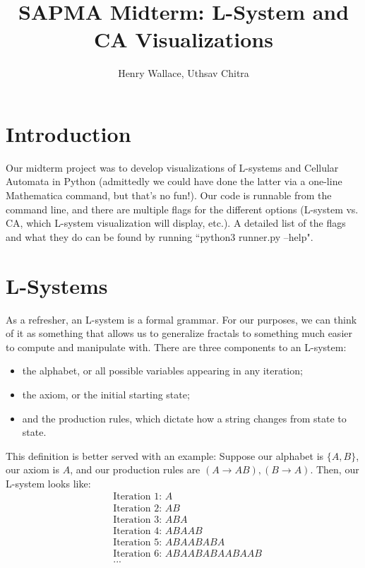 \documentclass[a4paper,11pt]{article}
\title{SAPMA Midterm: L-System and CA Visualizations}
\author{Henry Wallace, Uthsav Chitra}
\theoremstyle{quest}
\begin{document}
\maketitle

\section{Introduction}

Our midterm project was to develop visualizations of L-systems and Cellular Automata in Python (admittedly we could have done the latter via a one-line Mathematica command, but that's no fun!). Our code is runnable from the command line, and there are multiple flags for the different options (L-system vs. CA, which L-system visualization will display, etc.). A detailed list of the flags and what they do can be found by running ``python3 runner.py --help".

\section{L-Systems}

As a refresher, an L-system is a formal grammar. For our purposes, we can think of it as something that allows us to generalize fractals to something much easier to compute and manipulate with. There are three components to an L-system:

\begin{itemize}

\item the alphabet, or all possible variables appearing in any iteration;

\item the axiom, or the initial starting state;

\item and the production rules, which dictate how a string changes from state to state.

\end{itemize}

This definition is better served with an example: Suppose our alphabet is $\{A, B\}$, our axiom is $A$, and our production rules are $(A\rightarrow AB), (B\rightarrow A)$. Then, our L-system looks like:
\begin{align*}
&\text{Iteration 1: } A \\
&\text{Iteration 2: } AB \\
&\text{Iteration 3: } ABA \\
&\text{Iteration 4: } ABAAB \\
&\text{Iteration 5: } ABAABABA \\
&\text{Iteration 6: } ABAABABAABAAB \\
&...
\end{align*}
\end{document}
